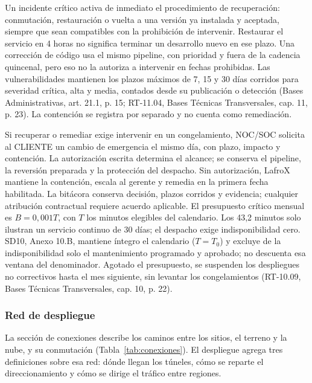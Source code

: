 Un incidente crítico activa de inmediato el procedimiento de recuperación: conmutación, restauración o vuelta a una versión ya instalada y aceptada, siempre que sean compatibles con la prohibición de intervenir. Restaurar el servicio en 4 horas no significa terminar un desarrollo nuevo en ese plazo. Una corrección de código usa el mismo pipeline, con prioridad y fuera de la cadencia quincenal, pero eso no la autoriza a intervenir en fechas prohibidas. Las vulnerabilidades mantienen los plazos máximos de 7, 15 y 30 días corridos para severidad crítica, alta y media, contados desde su publicación o detección (Bases Administrativas, art. 21.1, p. 15; RT-11.04, Bases Técnicas Transversales, cap. 11, p. 23). La contención se registra por separado y no cuenta como remediación.

Si recuperar o remediar exige intervenir en un congelamiento, NOC/SOC solicita al CLIENTE un cambio de emergencia el mismo día, con plazo, impacto y contención. La autorización escrita determina el alcance; se conserva el pipeline, la reversión preparada y la protección del despacho. Sin autorización, LafroX mantiene la contención, escala al gerente y remedia en la primera fecha habilitada. La bitácora conserva decisión, plazos corridos y evidencia; cualquier atribución contractual requiere acuerdo aplicable. El presupuesto crítico mensual es $B=0{,}001T$, con $T$ los minutos elegibles del calendario. Los 43,2 minutos solo ilustran un servicio continuo de 30 días; el despacho exige indisponibilidad cero. SD10, Anexo 10.B, mantiene íntegro el calendario ($T=T_0$) y excluye de la indisponibilidad solo el mantenimiento programado y aprobado; no descuenta esa ventana del denominador. Agotado el presupuesto, se suspenden los despliegues no correctivos hasta el mes siguiente, sin levantar los congelamientos (RT-10.09, Bases Técnicas Transversales, cap. 10, p. 22).

\subsubsection{Red de despliegue}
\label{sub:2-redes-topologia-segmentacion-y-conectivi}

La sección de conexiones describe los caminos entre los sitios, el terreno y la nube, y su conmutación (Tabla~\ref{tab:conexiones}). El despliegue agrega tres definiciones sobre esa red: dónde llegan los túneles, cómo se reparte el direccionamiento y cómo se dirige el tráfico entre regiones.

